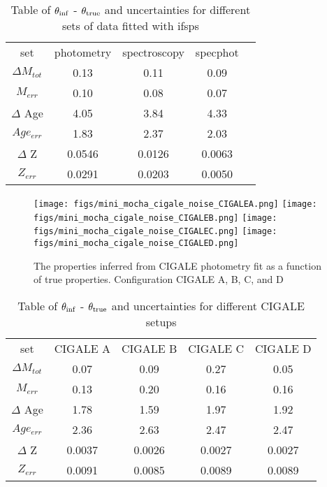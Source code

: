 \begin{table}
\caption{Table of $\theta_{\rm inf}$ - $\theta_{\rm true}$ and uncertainties for different sets of data fitted with ifsps} 
\begin{center} 
\begin{tabular}{ccccc} \toprule
set & photometry & spectroscopy & specphot \\
$\Delta M_{tot}$ & 0.13 & 0.11 & 0.09\\
$M_{err}$ & 0.10 & 0.08 & 0.07 \\
$\Delta$ Age & 4.05 & 3.84 & 4.33\\
$Age_{err}$ & 1.83 & 2.37 & 2.03\\
$\Delta$ Z & 0.0546 & 0.0126 & 0.0063 \\
$Z_{err}$ & 0.0291 & 0.0203 & 0.0050\\
\hline 
\hline            
\end{tabular} \label{tab:setups}
\end{center}
\end{table}

\begin{figure}
\begin{center}
\texttt{[image: figs/mini\_mocha\_cigale\_noise\_CIGALEA.png]} 
\texttt{[image: figs/mini\_mocha\_cigale\_noise\_CIGALEB.png]} 
\texttt{[image: figs/mini\_mocha\_cigale\_noise\_CIGALEC.png]}
\texttt{[image: figs/mini\_mocha\_cigale\_noise\_CIGALED.png]}
\caption{The properties inferred from CIGALE photometry fit as a function of true properties. Configuration CIGALE A, B, C, and D 
}
\label{fig:photo_cigale}
\end{center}
\end{figure}

\begin{table}
\caption{Table of $\theta_{\rm inf}$ - $\theta_{\rm true}$ and uncertainties for different CIGALE setups  } 
\begin{center} 
\begin{tabular}{ccccc} \toprule
set & CIGALE A & CIGALE B & CIGALE C & CIGALE D \\
$\Delta M_{tot}$ & 0.07 & 0.09 & 0.27 & 0.05\\
$M_{err}$ & 0.13 & 0.20 & 0.16 & 0.16\\
$\Delta$ Age & 1.78 & 1.59 & 1.97& 1.92\\
$Age_{err}$ & 2.36 & 2.63 & 2.47 & 2.47\\
$\Delta$ Z & 0.0037 & 0.0026 & 0.0027 & 0.0027\\
$Z_{err}$ & 0.0091 & 0.0085 & 0.0089 & 0.0089\\
\hline 
\hline            
\end{tabular} \label{tab:setups}
\end{center}
\end{table}

